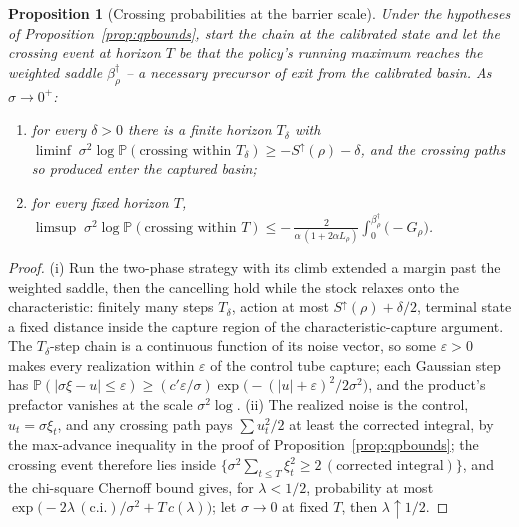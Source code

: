 \documentclass[11pt]{article}
\newtheorem{proposition}[theorem]{Proposition}
\theoremstyle{definition}
\theoremstyle{remark}
\numberwithin{equation}{section}
\begin{document}
\begin{proposition}[Crossing probabilities at the barrier scale]\label{prop:arrwindow}
Under the hypotheses of Proposition~\ref{prop:qpbounds}, start the chain at the calibrated state and let the crossing event at horizon $T$ be that the policy's running maximum reaches the weighted saddle $\beta^\dagger_\rho$ -- a necessary precursor of exit from the calibrated basin. As $\sigma \to 0^+$:
\begin{enumerate}
\item[(i)] for every $\delta > 0$ there is a finite horizon $T_\delta$ with
$\liminf\; \sigma^2 \log \mathbb{P}(\text{crossing within } T_\delta) \ge -S^{\uparrow}(\rho) - \delta$, and the crossing paths so produced enter the captured basin;
\item[(ii)] for every fixed horizon $T$,
$\displaystyle \limsup\; \sigma^2 \log \mathbb{P}(\text{crossing within } T) \le -\,\frac{2}{\alpha\,(1+2\alpha L_\rho)}\int_0^{\beta^\dagger_\rho}\bigl(-G_\rho\bigr)$.
\end{enumerate}
\end{proposition}
\begin{proof}
(i) Run the two-phase strategy with its climb extended a margin past the weighted saddle, then the cancelling hold while the stock relaxes onto the characteristic: finitely many steps $T_\delta$, action at most $S^{\uparrow}(\rho)+\delta/2$, terminal state a fixed distance inside the capture region of the characteristic-capture argument. The $T_\delta$-step chain is a continuous function of its noise vector, so some $\varepsilon > 0$ makes every realization within $\varepsilon$ of the control tube capture; each Gaussian step has $\mathbb{P}(|\sigma\xi - u| \le \varepsilon) \ge (c'\varepsilon/\sigma)\exp\bigl(-(|u|+\varepsilon)^2/2\sigma^2\bigr)$, and the product's prefactor vanishes at the scale $\sigma^2\log$. (ii) The realized noise is the control, $u_t = \sigma\xi_t$, and any crossing path pays $\sum u_t^2/2$ at least the corrected integral, by the max-advance inequality in the proof of Proposition~\ref{prop:qpbounds}; the crossing event therefore lies inside $\{\sigma^2\sum_{t\le T}\xi_t^2 \ge 2\,(\text{corrected integral})\}$, and the chi-square Chernoff bound gives, for $\lambda < 1/2$, probability at most $\exp\bigl(-2\lambda\,(\text{c.i.})/\sigma^2 + T\,c(\lambda)\bigr)$; let $\sigma \to 0$ at fixed $T$, then $\lambda \uparrow 1/2$.
\end{proof}
\end{document}
